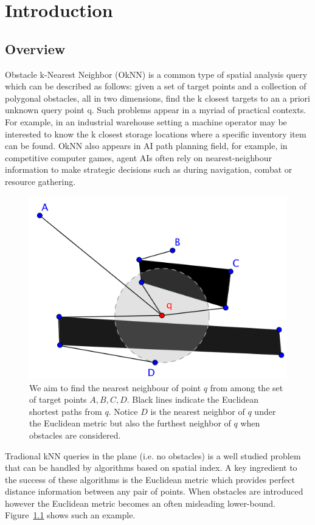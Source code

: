 \chapter{Introduction}
\section{Overview}
Obstacle k-Nearest Neighbor (OkNN) is a common type
of spatial analysis query which can be described as follows:
given a set of target points and a collection of polygonal obstacles,
all in two dimensions, find the k closest targets to
an a priori unknown query point q. Such problems appear
in a myriad of practical contexts. For example, in an industrial
warehouse setting a machine operator may be interested
to know the k closest storage locations where a specific inventory
item can be found. OkNN also appears in AI path planning field, for example,
in competitive computer games, agent AIs often rely on nearest-neighbour information
to make strategic decisions such as during navigation,
combat or resource gathering.

\begin{figure}[htp]
  \centering
  \includegraphics[width=.7\linewidth]{./pic/obs_dis.png}
  \caption{\small
  We aim to find the nearest neighbour of point $q$ from among the set of target points $A,B,C,D$.
  Black lines indicate the Euclidean shortest paths from $q$.
  Notice $D$ is the nearest neighbor of $q$ under the Euclidean metric
  but also the furthest neighbor of $q$ when obstacles are considered.}
\label{obs_dis}
\end{figure}

Tradional kNN queries in the plane (i.e. no obstacles) is a well studied problem that can be
handled by algorithms based on spatial index. A key ingredient to the success of
these algorithms is the Euclidean metric which provides perfect distance information between
any pair of points. When obstacles are introduced however the Euclidean metric becomes an often
misleading lower-bound. Figure~\ref{obs_dis} shows such an example.


